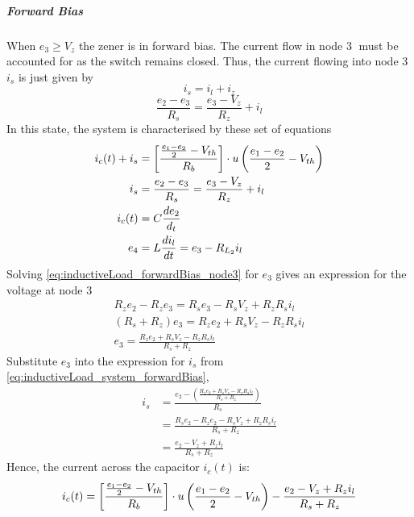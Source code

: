 \subparagraph{Forward Bias}
When $e_3 \geq V_z$ the zener is in forward bias. The current flow in node \textcircled{3} must be accounted for as the switch remains closed. Thus, the current flowing into node \textcircled{3} $i_s$ is just given by $$i_s = i_l + i_z$$
\begin{equation}
	\frac{e_2 - e_3}{R_s} = \frac{e_3 - V_z}{R_z} + i_l
	\label{eq:inductiveLoad_forwardBias_node3}
\end{equation}
In this state, the system is characterised by these set of equations
\begin{equation}
	\begin{split}
		i_c(t) + i_s &= \left[\frac{\frac{e_1 - e_2}{2} - V_{th}}{R_b} \right]\cdot u\left(\frac{e_1 - e_2}{2} - V_{th} \right) \\
		i_s &= \frac{e_2 - e_3}{R_s} = \frac{e_3 - V_z}{R_z} + i_l \\
		i_c(t) &= C \frac{de_2}{d_t} \\
		e_4 &= L\frac{di_l}{dt} = e_3 - R_{L_2}i_l
	\end{split}
	\label{eq:inductiveLoad_system_forwardBias}
\end{equation}
Solving \eqref{eq:inductiveLoad_forwardBias_node3} for $e_3$ gives an expression for the voltage at node \textcircled{3}
\begin{equation}
	\begin{split}
		R_z e_2 - R_z e_3 = R_s e_3 - R_s V_z + R_z R_s i_l \\
		(R_s + R_z) e_3 = R_z e_2 + R_s V_z - R_z R_s i_l \\
		e_3 = \frac{R_z e_2 + R_s V_z - R_z R_s i_l}{R_s + R_z}
	\end{split}
	\label{eq:inductiveLoad_forwardBias_e3}
\end{equation}
Substitute $e_3$ into the expression for $i_s$ from \eqref{eq:inductiveLoad_system_forwardBias},
\begin{equation}
	\begin{split}
		i_s &= \frac{e_2 - \left(\frac{R_z e_2 + R_s V_z - R_z R_s i_l}{R_s + R_z}\right)}{R_s} \\
		    &= \frac{R_s e_2 - R_z e_2 - R_s V_z + R_z R_s i_l}{R_s + R_z} \\
		    &= \frac{e_2 - V_z + R_z i_l}{R_s + R_z}
	\end{split}
\end{equation}
Hence, the current across the capacitor $i_c(t)$ is:
\begin{equation}
	i_c(t) = \left[\frac{\frac{e_1 - e_2}{2} - V_{th}}{R_b} \right]\cdot u\left(\frac{e_1 - e_2}{2} - V_{th} \right) - \frac{e_2 - V_z + R_z i_l}{R_s + R_z}
\end{equation}
